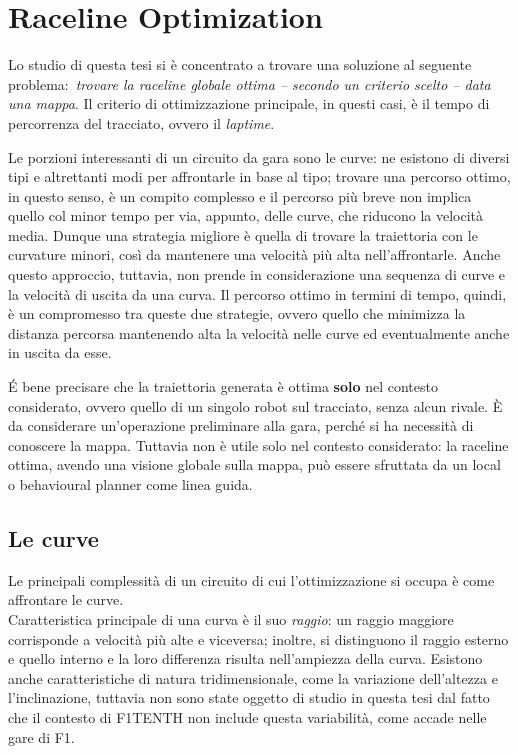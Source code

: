 
\chapter{Raceline Optimization}
\label{chap:opt}

Lo studio di questa tesi si è concentrato a trovare una soluzione al seguente problema:\ \textit{trovare
la raceline globale ottima \emph{\footnotesize -- secondo un criterio scelto --} data una mappa}. Il
criterio di ottimizzazione principale, in questi casi, è il tempo di percorrenza del tracciato, ovvero il
\textit{laptime}.

Le porzioni interessanti di un circuito da gara sono le curve: ne esistono di diversi tipi e altrettanti
modi per affrontarle in base al tipo; trovare una percorso ottimo, in questo senso, è un compito complesso e
il percorso più breve non implica quello col minor tempo per via, appunto, delle curve, che riducono la
velocità media. Dunque una strategia migliore è quella di trovare la traiettoria con le curvature minori,
così da mantenere una velocità più alta nell'affrontarle. Anche questo approccio, tuttavia, non prende in
considerazione una sequenza di curve e la velocità di uscita da una curva. Il percorso ottimo in termini
di tempo, quindi, è un compromesso tra queste due strategie, ovvero quello che minimizza la distanza
percorsa mantenendo alta la velocità nelle curve ed eventualmente anche in uscita da esse.

É bene precisare che la traiettoria generata è ottima \textbf{solo} nel contesto considerato, ovvero
quello di un singolo robot sul tracciato, senza alcun rivale. È da considerare un'operazione preliminare
alla gara, perché si ha necessità di conoscere la mappa.
Tuttavia non è utile solo nel contesto considerato: la raceline ottima, avendo una visione globale sulla
mappa, può essere sfruttata da un local o behavioural planner come linea guida.

\section{Le curve}
Le principali complessità di un circuito di cui l'ottimizzazione si occupa è come affrontare le curve.\\
Caratteristica principale di una curva è il suo \textit{raggio}: un raggio maggiore corrisponde a
velocità più alte e viceversa; inoltre, si distinguono il raggio esterno e quello interno e la loro
differenza risulta nell'ampiezza della curva.
Esistono anche caratteristiche di natura tridimensionale, come la variazione dell'altezza e
l'inclinazione, tuttavia non sono state oggetto di studio in questa tesi dal fatto che il contesto di
F1TENTH non include questa variabilità, come accade nelle gare di F1.

